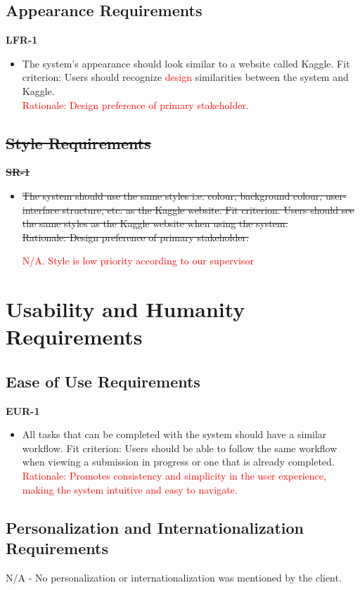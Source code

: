 \documentclass[12pt]{article}
\begin{document}
\subsection{Appearance Requirements}
\textbf{LFR-1}
\begin{itemize}
    \item The system’s appearance should look similar to a website called Kaggle. \hfill \break
    Fit criterion: Users should recognize \textcolor{red}{design} similarities between the system and Kaggle. \\
    \textcolor{red} {Rationale: Design preference of primary stakeholder.}
\end{itemize}

\subsection{\sout{Style Requirements}}
\textbf{\sout{SR-1}}
\begin{itemize}
    \item \sout{The system should use the same styles i.e. colour, background colour, user-interface structure, etc. as the Kaggle website. \hfill \break
    Fit criterion: Users should see the same styles as the Kaggle website when using the system. \\
    Rationale: Design preference of primary stakeholder.}
    
    \textcolor{red}{N/A. Style is low priority according to our supervisor}
\end{itemize}


\section{Usability and Humanity Requirements}
\subsection{Ease of Use Requirements}
\textbf{EUR-1}
\begin{itemize}
    \item All tasks that can be completed with the system should have a similar workflow.\hfill \break
    Fit criterion: Users should be able to follow the same workflow when viewing a submission in progress or one that is already completed.
    \hfill \break
    \textcolor{red} {Rationale: Promotes consistency and simplicity in the user experience, making the system intuitive and easy to navigate.}
\end{itemize}
\subsection{Personalization and Internationalization Requirements}
N/A - No personalization or internationalization was mentioned by the client.
\end{document}
